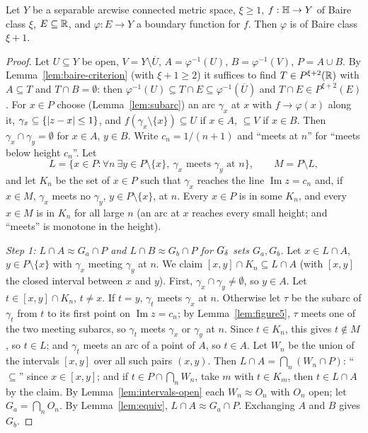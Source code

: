 \begin{theorem}\label{thm:baire-plus-one}
Let $Y$ be a separable arcwise connected metric space, $\xi\ge1$, $f:\mathbb{H}\to Y$ of Baire class $\xi$, $E\subseteq\mathbb{R}$, and
$\varphi:E\to Y$ a boundary function for $f$. Then $\varphi$ is of Baire class $\xi+1$.
\end{theorem}
\begin{proof}
Let $U\subseteq Y$ be open, $V=Y\setminus\overline U$, $A=\varphi^{-1}(U)$, $B=\varphi^{-1}(V)$, $P=A\cup B$. By
Lemma~\ref{lem:baire-criterion} (with $\xi+1\ge2$) it suffices to find $T\in P^{\xi+2}(\mathbb{R})$ with $A\subseteq T$ and
$T\cap B=\emptyset$: then $\varphi^{-1}(U)\subseteq T\cap E\subseteq\varphi^{-1}(\overline U)$ and $T\cap E\in P^{\xi+2}(E)$.
For $x\in P$ choose (Lemma~\ref{lem:subarc}) an arc $\gamma_x$ at $x$ with $f\to\varphi(x)$ along it,
$\gamma_x\subseteq\{\lvert z-x\rvert\le1\}$, and $f(\gamma_x\setminus\{x\})\subseteq U$ if $x\in A$, $\subseteq V$ if $x\in B$. Then
$\gamma_x\cap\gamma_y=\emptyset$ for $x\in A$, $y\in B$. Write $c_n=1/(n+1)$ and ``meets at $n$'' for ``meets below height
$c_n$''. Let
\[
L=\{x\in P:\forall n\ \exists y\in P\setminus\{x\},\ \gamma_x\text{ meets }\gamma_y\text{ at }n\},\qquad M=P\setminus L,
\]
and let $K_n$ be the set of $x\in P$ such that $\gamma_x$ reaches the line $\operatorname{Im}z=c_n$ and, if $x\in M$, $\gamma_x$
meets no $\gamma_y$, $y\in P\setminus\{x\}$, at $n$. Every $x\in P$ is in some $K_n$, and every $x\in M$ is in $K_n$ for all
large $n$ (an arc at $x$ reaches every small height; and ``meets'' is monotone in the height).

\emph{Step 1: $L\cap A\approx G_a\cap P$ and $L\cap B\approx G_b\cap P$ for $G_\delta$ sets $G_a,G_b$.} Let $x\in L\cap A$,
$y\in P\setminus\{x\}$ with $\gamma_x$ meeting $\gamma_y$ at $n$. We claim $[x,y]\cap K_n\subseteq L\cap A$ (with $[x,y]$ the
closed interval between $x$ and $y$). First, $\gamma_x\cap\gamma_y\ne\emptyset$, so $y\in A$. Let $t\in[x,y]\cap K_n$, $t\ne x$.
If $t=y$, $\gamma_t$ meets $\gamma_x$ at $n$. Otherwise let $\tau$ be the subarc of $\gamma_t$ from $t$ to its first point on
$\operatorname{Im}z=c_n$; by Lemma~\ref{lem:figure5}, $\tau$ meets one of the two meeting subarcs, so $\gamma_t$ meets $\gamma_x$
or $\gamma_y$ at $n$. Since $t\in K_n$, this gives $t\notin M$, so $t\in L$; and $\gamma_t$ meets an arc of a point of $A$, so
$t\in A$. Let $W_n$ be the union of the intervals $[x,y]$ over all such pairs $(x,y)$. Then
$L\cap A=\bigcap_n(W_n\cap P)$: ``$\subseteq$'' since $x\in[x,y]$; and if $t\in P\cap\bigcap_nW_n$, take $m$ with $t\in K_m$, then
$t\in L\cap A$ by the claim. By Lemma~\ref{lem:intervals-open} each $W_n\approx O_n$ with $O_n$ open; let $G_a=\bigcap_nO_n$. By
Lemma~\ref{lem:equiv}, $L\cap A\approx G_a\cap P$. Exchanging $A$ and $B$ gives $G_b$.


\end{proof}
